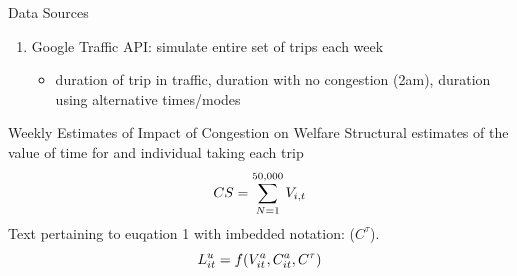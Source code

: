 \documentclass[newPxFont]{beamer}
\begin{document}
\begin{frame}[c]{Data Sources}
\begin{enumerate}
		\begin{itemize}
			\item{origin/destination, day/time, mode, monetary cost of trip}
			\item{residence, car ownership, income, purpose of trip}
		\end{itemize}
		\item{Google Traffic API: simulate entire set of trips each week}\\
		\begin{itemize}
			\item{duration of trip in traffic, duration with no congestion (2am), duration using alternative times/modes}
		\end{itemize}
	\end{enumerate}
\end{frame}

\begin{frame}{Weekly Estimates of Impact of Congestion on Welfare}
	Structural estimates of the value of time for and individual taking each trip
	\begin{equation}{\label{eq1}}
	CS = \sum\limits_{N=1}^{50,000}V_{i,t}   
	\end{equation}
	Text pertaining to euqation 1 with imbedded notation: ($C^{\tau}$).
	\begin{equation}{\label{eq2}}
	L_{it}^{u}=f(V_{it}^{a},C_{it}^{a},C^{\tau})
	\end{equation}
\end{frame}

\end{document}
